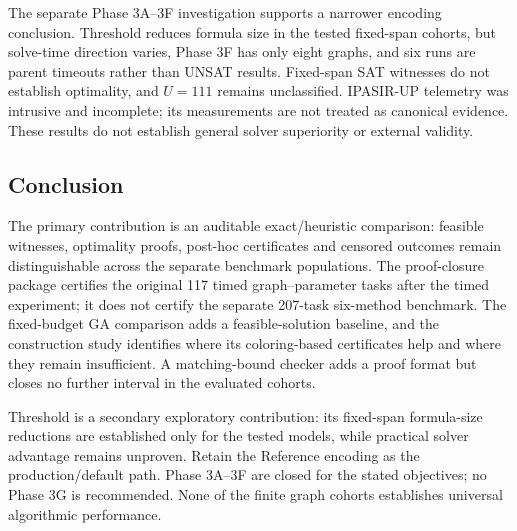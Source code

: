 The separate Phase 3A--3F investigation supports a narrower encoding
conclusion. Threshold reduces formula size in the tested fixed-span
cohorts, but solve-time direction varies, Phase 3F has only eight graphs,
and six runs are parent timeouts rather than UNSAT results. Fixed-span
SAT witnesses do not establish optimality, and $U=111$ remains
unclassified. IPASIR-UP telemetry was intrusive and incomplete; its
measurements are not treated as canonical evidence. These results do not
establish general solver superiority or external validity.

\subsection{Conclusion}
The primary contribution is an auditable exact/heuristic comparison:
feasible witnesses, optimality proofs, post-hoc certificates and censored
outcomes remain distinguishable across the separate benchmark
populations. The proof-closure package certifies the original 117 timed
graph--parameter tasks after the timed experiment; it does not certify
the separate 207-task six-method benchmark. The fixed-budget GA comparison
adds a feasible-solution baseline, and the construction study identifies
where its coloring-based certificates help and where they remain
insufficient. A matching-bound checker adds a proof format but closes no
further interval in the evaluated cohorts.

Threshold is a secondary exploratory contribution: its fixed-span
formula-size reductions are established only for the tested models, while
practical solver advantage remains unproven. Retain the Reference
encoding as the production/default path. Phase 3A--3F are closed for the
stated objectives; no Phase 3G is recommended. None of the finite graph
cohorts establishes universal algorithmic performance.
